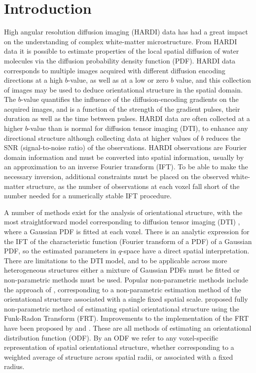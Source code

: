 \documentclass[authoryear,preprint,12pt]{elsarticle}
\begin{document}


\section{Introduction}
\label{intro}

High angular resolution diffusion imaging (HARDI) data has had a great
impact on the understanding of complex white-matter microstructure.
From HARDI data it is possible to estimate properties of the local
spatial diffusion of water molecules via the diffusion probability
density function (PDF).  HARDI data corresponds to multiple images
acquired with different diffusion encoding directions at a high
$b$-value, as well as at a low or zero $b$ value, and this collection
of images may be used to deduce orientational structure in the spatial
domain.  The $b$-value quantifies the influence of the
diffusion-encoding gradients on the acquired images, and is a function
of the strength of the gradient pulses, their duration as well as the
time between pulses.  HARDI data are often collected at a higher
$b$-value than is normal for diffusion tensor imaging (DTI), to
enhance any directional structure although collecting data at higher
values of $b$ reduces the SNR (signal-to-noise ratio) of the
observations.  HARDI observations are Fourier domain information and
must be converted into spatial information, usually by an
approximation to an inverse Fourier transform (IFT).  To be able to
make the necessary inversion, additional constraints must be placed on
the observed white-matter structure, as the number of observations at
each voxel fall short of the number needed for a numerically stable
IFT procedure.

A number of methods exist for the analysis of orientational structure,
with the most straightforward model corresponding to diffusion tensor
imaging (DTI) \citep{Basser1994b,Basser1994}, where a Gaussian PDF is
fitted at each voxel.  There is an analytic expression for the IFT of
the characteristic function (Fourier transform of a PDF) of a Gaussian
PDF, so the estimated parameters in $q$-space have a direct spatial
interpretation.  There are limitations to the DTI model, and to be
applicable across more heterogeneous structures either a mixture of
Gaussian PDFs must be fitted \citep{Alexander2005} or non-parametric
methods must be used.  Popular non-parametric methods include the
approach of \citet{Jansons}, corresponding to a non-parametric
estimation method of the orientational structure associated with a
single fixed spatial scale.  \citet{Tuch} proposed fully
non-parametric method of estimating spatial orientational structure
using the Funk-Radon Transform (FRT).  Improvements to the
implementation of the FRT have been proposed by \citet{Hess} and
\citet{Descoteaux}.  These are all methods of estimating an
orientational distribution function (ODF).  By an ODF we refer to any
voxel-specific representation of spatial orientational structure,
whether corresponding to a weighted average of structure across
spatial radii, or associated with a fixed radius.
\end{document}
